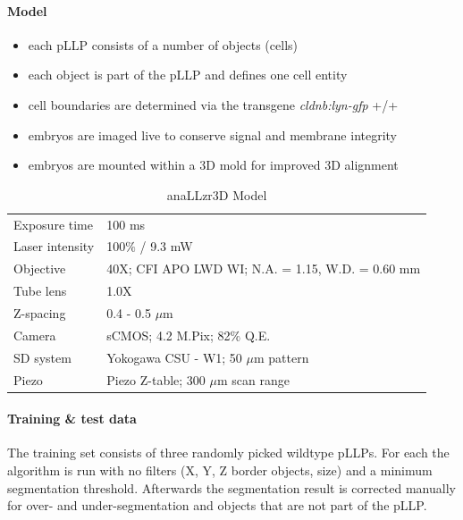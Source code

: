 \documentclass[10pt, b5paper, singlespacinge, twoside]{reedthesis} %
\providecommand{\tightlist}{%
  \setlength{\itemsep}{0pt}\setlength{\parskip}{0pt}}
\theoremstyle{definition}
\theoremstyle{definition}
\theoremstyle{definition}
\theoremstyle{remark}
\begin{document}
\hypertarget{model-1}{%
\paragraph{Model}\label{model-1}}
\begin{itemize}
\tightlist
\item
  each pLLP consists of a number of objects (cells)
\item
  each object is part of the pLLP and defines one cell entity
\item
  cell boundaries are determined via the transgene \emph{cldnb:lyn-gfp} +/+
\item
  embryos are imaged live to conserve signal and membrane integrity
\item
  embryos are mounted within a 3D mold for improved 3D alignment
\end{itemize}
\begin{table}[!h]

\caption{\label{tab:model3DGrT}anaLLzr3D Model}
\centering
\begin{tabu} to 
\toprule
{}  Exposure time & 100 ms\\
Laser intensity & 100$\%$ / 9.3 mW\\
  Objective & 40X; CFI APO LWD WI; N.A. = 1.15, W.D. = 0.60 mm\\
Tube lens & 1.0X\\
  Z-spacing & 0.4 - 0.5 $\mu$m\\
\addlinespace
Camera & sCMOS; 4.2 M.Pix; 82$\%$ Q.E.\\
  SD system & Yokogawa CSU - W1; 50 $\mu$m pattern\\
Piezo & Piezo Z-table; 300 $\mu$m scan range\\
\bottomrule
\end{tabu}
\end{table}
\hypertarget{training-test-data-1}{%
\paragraph{Training \& test data}\label{training-test-data-1}}

The training set consists of three randomly picked wildtype pLLPs. For each the algorithm is run with no filters (X, Y, Z border objects, size) and a minimum segmentation threshold. Afterwards the segmentation result is corrected manually for over- and under-segmentation and objects that are not part of the pLLP.
\end{document}
